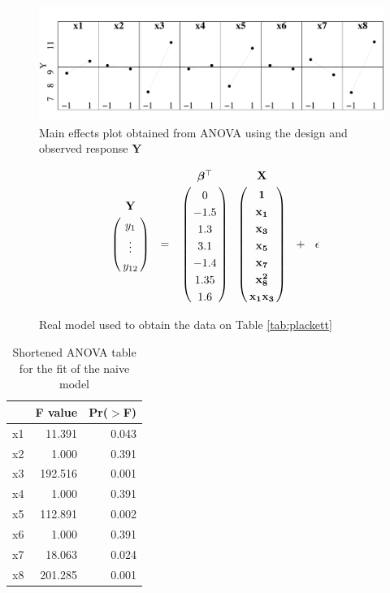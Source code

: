 \documentclass[conference]{IEEEtran}
\begin{document}
\begin{center}
\begin{figure}[htbp]
\centering
\includegraphics[width=.95\columnwidth]{./img/main_effects.pdf}
\caption{\label{fig:org1e9acef}
Main effects plot obtained from ANOVA using the design and observed response \(\mathbf{Y}\)}
\end{figure}
\end{center}

\begin{figure}
{\normalsize
\begin{align*}
\bordermatrix{ ~ & \mathbf{Y} \cr & y_1 \cr & \vdots \cr & y_{12}} \ \ =
\bordermatrix{~ & \bm{\beta}^{\top} \cr & 0 \cr & -1.5 \cr & 1.3 \cr & 3.1 \cr & -1.4 \cr & 1.35 \cr & 1.6}
\bordermatrix{~ & \mathbf{X} \cr & \mathbf{1} \cr & \mathbf{x_1} \cr & \mathbf{x_3} \cr & \mathbf{x_5}
\cr & \mathbf{x_7} \cr & \mathbf{x_8^{2}} \cr & \mathbf{x_1x_3}} \ \ +
\ \ \epsilon
\end{align*}
}
\caption{Real model used to obtain the data on Table \ref{tab:plackett}}
\end{figure}

\begin{table}[ht]
\centering
\caption{Shortened ANOVA table for the fit of the naive model}
\begingroup\small
\begin{tabular}{lrr}
  \toprule
 & F value & Pr($>$F) \\
  \midrule
x1          & 11.391 & 0.043 \\
  x2          & 1.000 & 0.391 \\
  x3          & 192.516 & 0.001 \\
  x4          & 1.000 & 0.391 \\
  x5          & 112.891 & 0.002 \\
  x6          & 1.000 & 0.391 \\
  x7          & 18.063 & 0.024 \\
  x8          & 201.285 & 0.001 \\
   \bottomrule
\end{tabular}
\endgroup
\end{table}
\end{document}
